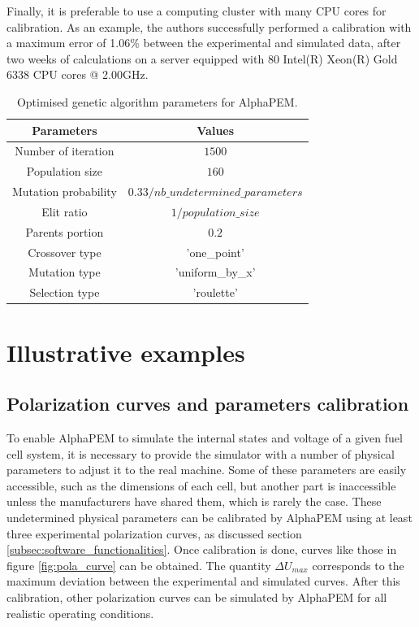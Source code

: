 \documentclass[postprint,3p,times]{elsarticle}
\begin{document}
Finally, it is preferable to use a computing cluster with many CPU cores for calibration. As an example, the authors successfully performed a calibration with a maximum error of 1.06\% between the experimental and simulated data, after two weeks of calculations on a server equipped with 80 Intel(R) Xeon(R) Gold 6338 CPU cores @ 2.00GHz.

\begin{table}[!h]
	\centering
	\begin{tabular}{|c|c|} \hline
		
		\textbf{Parameters} & \textbf{Values} \\ \hline
		
		Number of iteration & $1500$ \\
		Population size & $160$ \\
		Mutation probability & $0.33 / nb\_undetermined\_parameters$ \\
		Elit ratio & $1 / population\_size$ \\
		Parents portion & $0.2$ \\
		Crossover type & 'one\_point' \\
		Mutation type & 'uniform\_by\_x' \\
		Selection type & 'roulette' \\ \hline
		
	\end{tabular}
	\caption{Optimised genetic algorithm parameters for AlphaPEM.}
	\label{table:genetic_param}
\end{table}


\section{Illustrative examples}
\subsection{Polarization curves and parameters calibration}

To enable AlphaPEM to simulate the internal states and voltage of a given fuel cell system, it is necessary to provide the simulator with a number of physical parameters to adjust it to the real machine. Some of these parameters are easily accessible, such as the dimensions of each cell, but another part is inaccessible unless the manufacturers have shared them, which is rarely the case. These undetermined physical parameters can be calibrated by AlphaPEM using at least three experimental polarization curves, as discussed section \ref{subsec:software_functionalities}. Once calibration is done, curves like those in figure \ref{fig:pola_curve} can be obtained. The quantity $\Delta U_{max}$ corresponds to the maximum deviation between the experimental and simulated curves. After this calibration, other polarization curves can be simulated by AlphaPEM for all realistic operating conditions.
\end{document}
